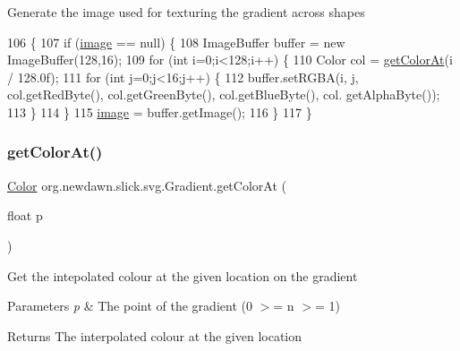 Generate the image used for texturing the gradient across shapes 
\begin{DoxyCode}
106                            \{
107         \textcolor{keywordflow}{if} (\mbox{\hyperlink{classorg_1_1newdawn_1_1slick_1_1svg_1_1_gradient_ac3ba3aa0d42efe130b9b1e6a0da020cb}{image}} == null) \{
108             ImageBuffer buffer = \textcolor{keyword}{new} ImageBuffer(128,16);
109             \textcolor{keywordflow}{for} (\textcolor{keywordtype}{int} i=0;i<128;i++) \{
110                 Color col = \mbox{\hyperlink{classorg_1_1newdawn_1_1slick_1_1svg_1_1_gradient_ab9ed54040980ce74cab9764100223a6b}{getColorAt}}(i / 128.0f);
111                 \textcolor{keywordflow}{for} (\textcolor{keywordtype}{int} j=0;j<16;j++) \{
112                     buffer.setRGBA(i, j, col.getRedByte(), col.getGreenByte(), col.getBlueByte(), col.
      getAlphaByte());
113                 \}
114             \}
115             \mbox{\hyperlink{classorg_1_1newdawn_1_1slick_1_1svg_1_1_gradient_ac3ba3aa0d42efe130b9b1e6a0da020cb}{image}} = buffer.getImage();
116         \}
117     \}
\end{DoxyCode}
\mbox{\label{classorg_1_1newdawn_1_1slick_1_1svg_1_1_gradient_ab9ed54040980ce74cab9764100223a6b}} 
\subsubsection{\texorpdfstring{get\+Color\+At()}{getColorAt()}}
{\footnotesize\ttfamily \mbox{\hyperlink{classorg_1_1newdawn_1_1slick_1_1_color}{Color}} org.\+newdawn.\+slick.\+svg.\+Gradient.\+get\+Color\+At (\begin{DoxyParamCaption}\item[{float}]{p }\end{DoxyParamCaption})\hspace{0.3cm}{\ttfamily [inline]}}

Get the intepolated colour at the given location on the gradient


\begin{DoxyParams}{Parameters}
{\em p} & The point of the gradient (0 $>$= n $>$= 1) \\
\hline
\end{DoxyParams}
\begin{DoxyReturn}{Returns}
The interpolated colour at the given location 
\end{DoxyReturn}

